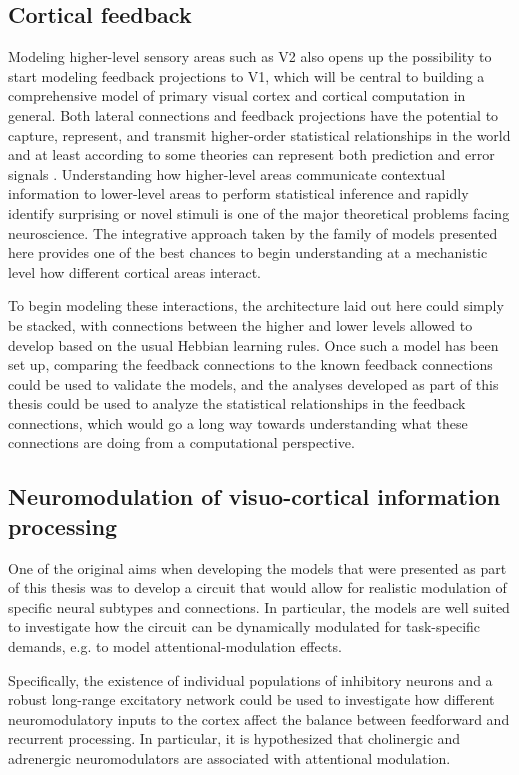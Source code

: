 \subsection{Cortical feedback}

Modeling higher-level sensory areas such as V2 also opens up the
possibility to start modeling feedback projections to V1, which will
be central to building a comprehensive model of primary visual cortex
and cortical computation in general. Both lateral connections and
feedback projections have the potential to capture, represent, and
transmit higher-order statistical relationships in the world and at
least according to some theories can represent both prediction and
error signals \citep{Rao1999, Spratling2011}. Understanding how
higher-level areas communicate contextual information to lower-level
areas to perform statistical inference and rapidly identify surprising
or novel stimuli is one of the major theoretical problems facing
neuroscience.  The integrative approach taken by the family of
models presented here provides one of the best chances to begin
understanding at a mechanistic level how different cortical areas
interact.

To begin modeling these interactions, the architecture laid out here
could simply be stacked, with connections between the higher and lower
levels allowed to develop based on the usual Hebbian learning
rules. Once such a model has been set up, comparing the feedback
connections to the known feedback connections could be used to
validate the models, and the analyses developed as part of this thesis
could be used to analyze the statistical relationships in the feedback
connections, which would go a long way towards understanding what
these connections are doing from a computational perspective.

\subsection{Neuromodulation of visuo-cortical information processing}

One of the original aims when developing the models that were
presented as part of this thesis was to develop a circuit that would
allow for realistic modulation of specific neural subtypes and
connections. In particular, the models are well suited to investigate
how the circuit can be dynamically modulated for task-specific
demands, e.g. to model attentional-modulation effects.

Specifically, the existence of individual populations of inhibitory
neurons and a robust long-range excitatory network could be used to
investigate how different neuromodulatory inputs to the cortex affect
the balance between feedforward and recurrent processing. In
particular, it is hypothesized that cholinergic and adrenergic
neuromodulators are associated with attentional modulation.

